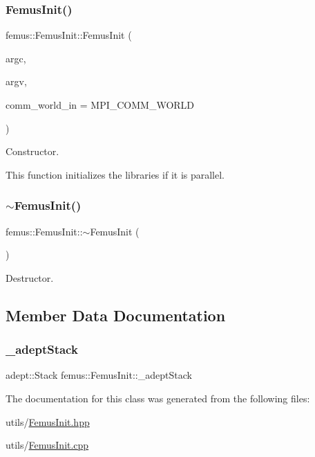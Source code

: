 \subsubsection{\texorpdfstring{Femus\+Init()}{FemusInit()}}
{\footnotesize\ttfamily femus\+::\+Femus\+Init\+::\+Femus\+Init (\begin{DoxyParamCaption}\item[{int \&}]{argc,  }\item[{char $\ast$$\ast$\&}]{argv,  }\item[{M\+P\+I\+\_\+\+Comm}]{comm\+\_\+world\+\_\+in = {\ttfamily MPI\+\_\+COMM\+\_\+WORLD} }\end{DoxyParamCaption})}



Constructor. 

This function initializes the libraries if it is parallel. \mbox{\label{classfemus_1_1_femus_init_a0d8bd96e2534e355eaf3621d012292ba}} 
\subsubsection{\texorpdfstring{$\sim$\+Femus\+Init()}{~FemusInit()}}
{\footnotesize\ttfamily femus\+::\+Femus\+Init\+::$\sim$\+Femus\+Init (\begin{DoxyParamCaption}{ }\end{DoxyParamCaption})}



Destructor. 



\subsection{Member Data Documentation}
\mbox{\label{classfemus_1_1_femus_init_ab48c1191eb7ebb370a323d3ec4f713c9}} 
\subsubsection{\texorpdfstring{\+\_\+adept\+Stack}{\_adeptStack}}
{\footnotesize\ttfamily adept\+::\+Stack femus\+::\+Femus\+Init\+::\+\_\+adept\+Stack\hspace{0.3cm}{\ttfamily [static]}}



The documentation for this class was generated from the following files\+:\begin{DoxyCompactItemize}
\item 
utils/\mbox{\hyperlink{_femus_init_8hpp}{Femus\+Init.\+hpp}}\item 
utils/\mbox{\hyperlink{_femus_init_8cpp}{Femus\+Init.\+cpp}}\end{DoxyCompactItemize}
